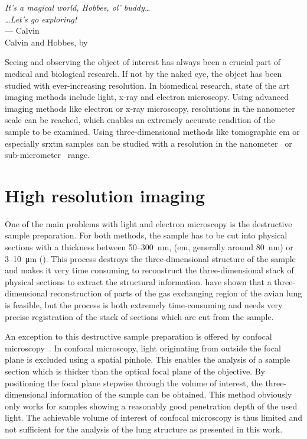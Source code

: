 \acresetall
{}\label{ch:introduction}
\begin{flushright}{\slshape
		It's a magical world, Hobbes, ol' buddy\ldots\\
		\ldots Let's go exploring!}\\ \medskip
		--- Calvin\\Calvin and Hobbes, by \citep{Watterson1996}
\end{flushright}
\vspace{6cm}

Seeing and observing the object of interest has always been a crucial part of medical and biological research. If not by the naked eye, the object has been studied with ever-increasing resolution. In biomedical research, state of the art imaging methods include light, x-ray and electron microscopy. Using advanced imaging methods like electron or x-ray microscopy, resolutions in the nanometer scale can be reached, which enables an extremely accurate rendition of the sample to be examined. Using three-dimensional methods like tomographic \ac{em} or especially \ac{srxtm} samples can be studied with a resolution in the nanometer~\cite{Downing2007} or sub-micrometer~\cite{Stampanoni2010} range.

\section{High resolution imaging}\label{sec:high resolution imaging}
One of the main problems with light and electron microscopy is the destructive sample preparation. For both methods, the sample has to be cut into physical sections with a thickness between 50--\SI{300}{\nano\meter}, (\acs{em}, generally around \SI{80}{\nano\meter}) or 3--\SI{10}{\micro\meter} (). This process destroys the three-dimensional structure of the sample and makes it very time consuming to reconstruct the three-dimensional stack of physical sections to extract the structural information. \citet{Woodward2005} have shown that a three-dimensional reconstruction of parts of the gas exchanging region of the avian lung is feasible, but the process is both extremely time-consuming and needs very precise registration of the stack of sections which are cut from the sample.

An exception to this destructive sample preparation is offered by confocal microscopy~\cite{Minsky1961}. In confocal microscopy, light originating from outside the focal plane is excluded using a spatial pinhole. This enables the analysis of a sample section which is thicker than the optical focal plane of the objective. By positioning the focal plane stepwise through the volume of interest, the three-dimensional information of the sample can be obtained. This method obviously only works for samples showing a reasonably good penetration depth of the used light. The achievable volume of interest of confocal microscopy is thus limited and not sufficient for the analysis of the lung structure as presented in this work. 


